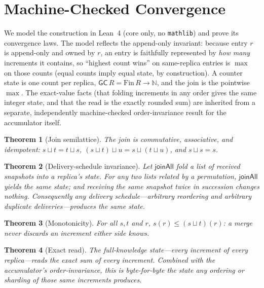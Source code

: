 \documentclass[11pt]{article}
\newtheorem{theorem}{Theorem}
\begin{document}
\section{Machine-Checked Convergence}\label{sec:proofs}

We model the construction in Lean~4 (core only, no \texttt{mathlib}) and prove its convergence laws.
The model reflects the append-only invariant: because entry $r$ is append-only and owned by $r$, an
entry is faithfully represented by \emph{how many} increments it contains, so ``highest count wins'' on
same-replica entries is $\max$ on those counts (equal counts imply equal state, by construction). A
counter state is one count per replica, $\mathsf{GC}\,R = \mathrm{Fin}\,R \to \mathbb{N}$, and the join
is the pointwise $\max$. The exact-value facts (that folding increments in any order gives the same
integer state, and that the read is the exactly rounded sum) are inherited from a separate, independently
machine-checked order-invariance result for the accumulator itself.

\begin{theorem}[Join semilattice]\label{thm:lattice}
The join is commutative, associative, and idempotent:
$s \sqcup t = t \sqcup s$, $(s\sqcup t)\sqcup u = s\sqcup(t\sqcup u)$, and $s \sqcup s = s$.
\end{theorem}

\begin{theorem}[Delivery-schedule invariance]\label{thm:sched}
Let $\mathsf{joinAll}$ fold a list of received snapshots into a replica's state. For any two lists
related by a permutation, $\mathsf{joinAll}$ yields the same state; and receiving the same snapshot
twice in succession changes nothing. Consequently \emph{any} delivery schedule---arbitrary reordering
and arbitrary duplicate deliveries---produces the same state.
\end{theorem}

\begin{theorem}[Monotonicity]\label{thm:mono}
For all $s,t$ and $r$, $s(r) \le (s \sqcup t)(r)$: a merge never discards an increment either side knows.
\end{theorem}

\begin{theorem}[Exact read]\label{thm:read}
The full-knowledge state---every increment of every replica---reads the exact sum of every increment.
Combined with the accumulator's order-invariance, this is byte-for-byte the state any ordering or
sharding of those same increments produces.
\end{theorem}
\end{document}
